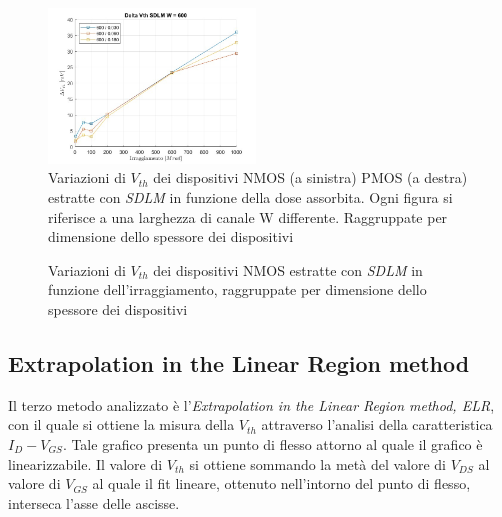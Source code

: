 \documentclass[12pt, letterpaper]{book}
\begin{document}
\begin{figure}[H]
  \includegraphics[width=0.49\textwidth]{sovrapposizione-deltaVth-SDLM-P600}
  \caption{Variazioni di $V_{th}$ dei dispositivi NMOS (a sinistra) PMOS (a destra) estratte con \emph{SDLM} in funzione della dose assorbita. Ogni figura si riferisce a una larghezza di canale W differente. Raggruppate per dimensione dello spessore dei dispositivi}
\end{figure}

\begin{figure}[H]
  \centering
  
  \caption{Variazioni di $V_{th}$ dei dispositivi NMOS estratte con \emph{SDLM} in funzione dell'irraggiamento, raggruppate per dimensione dello spessore dei dispositivi}
\end{figure}




\subsection{Extrapolation in the Linear Region method}

Il
terzo metodo analizzato è l'\emph{Extrapolation in the Linear Region method, ELR}, con il quale si ottiene la misura della $V_{th}$ attraverso l'analisi della caratteristica $I_D-V_{GS}$.  Tale grafico presenta un punto di flesso attorno al quale il grafico è linearizzabile. Il valore di $V_{th}$ si ottiene sommando la metà del valore di $V_{DS}$ al valore di $V_{GS}$ al quale il fit lineare, ottenuto nell'intorno del punto di flesso, interseca l'asse delle ascisse.\\
\end{document}
